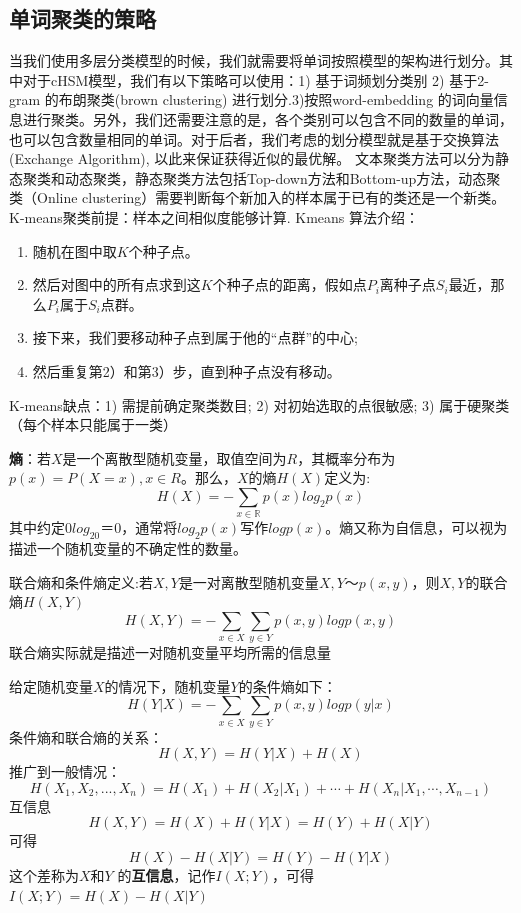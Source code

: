 \documentclass[12pt,a4paper]{article}
\begin{document}
\subsection{单词聚类的策略}
当我们使用多层分类模型的时候，我们就需要将单词按照模型的架构进行划分。其中对于cHSM模型，我们有以下策略可以使用：1) 基于词频划分类别 2) 基于2-gram 的布朗聚类(brown clustering) 进行划分.3)按照word-embedding 的词向量信息进行聚类。另外，我们还需要注意的是，各个类别可以包含不同的数量的单词，也可以包含数量相同的单词。对于后者，我们考虑的划分模型就是基于交换算法(Exchange Algorithm), 以此来保证获得近似的最优解。 文本聚类方法可以分为静态聚类和动态聚类，静态聚类方法包括Top-down方法和Bottom-up方法，动态聚类（Online clustering）需要判断每个新加入的样本属于已有的类还是一个新类。K-means聚类前提：样本之间相似度能够计算.
Kmeans 算法介绍：
\begin{enumerate}
  \item 随机在图中取$K$个种子点。
  \item 然后对图中的所有点求到这$K$个种子点的距离，假如点$P_i$离种子点$S_i$最近，那么$P_i$属于$S_i$点群。
  \item  接下来，我们要移动种子点到属于他的“点群”的中心;
  \item 然后重复第2）和第3）步，直到种子点没有移动。
\end{enumerate}
K-means缺点：1) 需提前确定聚类数目; 2) 对初始选取的点很敏感; 3) 属于硬聚类（每个样本只能属于一类）



\textbf{熵}：若$X$是一个离散型随机变量，取值空间为$R$，其概率分布为$p(x)=P(X=x),x\in R$。那么，$X$的熵$H(X)$定义为:
\begin{equation}
H(X) = -\sum_{x\in \mathbb{R}}p(x)log_2 p(x)
\end{equation}
其中约定$0log_20 ＝ 0$，通常将$log_2p(x)$写作$logp(x)$。熵又称为自信息，可以视为描述一个随机变量的不确定性的数量。

联合熵和条件熵定义:若$X,Y$是一对离散型随机变量$X,Y ～ p(x,y)$，则$X,Y$的联合熵$H(X,Y)$
\begin{equation}
H(X,Y) = -\sum_{x\in X}\sum_{y\in Y}p(x,y)logp(x,y)
\end{equation}
联合熵实际就是描述一对随机变量平均所需的信息量

给定随机变量$X$的情况下，随机变量$Y$的条件熵如下：
\begin{equation}
H(Y|X) = -\sum_{x\in X}\sum_{y\in Y}p(x,y)log p(y|x)
\end{equation}
条件熵和联合熵的关系：
\begin{equation}
H(X,Y)  = H(Y|X) + H(X)
\end{equation}
推广到一般情况：
\begin{equation}
H(X_1,X_2,...,X_n) = H(X_1)+H(X_2|X_1)+\cdots+H(X_n|X_1,\cdots,X_{n-1})
\end{equation}
互信息
\begin{equation}
H(X,Y) = H(X) + H(Y|X) = H(Y) + H(X|Y)
\end{equation}
可得
\begin{equation}
H(X)-H(X|Y) = H(Y)-H(Y|X)
\end{equation}
这个差称为$X$和$Y$ 的\textbf{互信息}，记作$I(X;Y)$，可得$I(X;Y)=H(X)-H(X|Y)$
\end{document}
